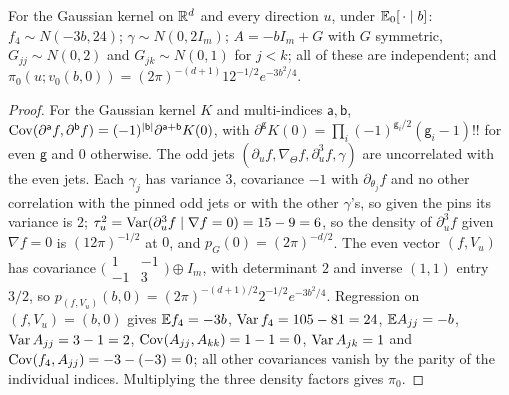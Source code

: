 \begin{lemma}\label{lem:cusp-gauss}
For the Gaussian kernel on $\mathbb R^d$ and every direction $u$, under $\mathbb E_0[\,\cdot\mid b]$: $f_4\sim N(-3b,24)$; $\gamma\sim N(0,2I_m)$; $A=-bI_m+G$ with $G$ symmetric, $G_{jj}\sim N(0,2)$ and $G_{jk}\sim N(0,1)$ for $j<k$; all of these are independent; and $\pi_0(u;v_0(b,0))=(2\pi)^{-(d+1)}12^{-1/2}e^{-3b^2/4}$.
\end{lemma}

\begin{proof}
For the Gaussian kernel $K$ and multi-indices $\mathsf a,\mathsf b$, $\operatorname{Cov}(\partial^{\mathsf a}f,\partial^{\mathsf b}f)=(-1)^{|\mathsf b|}\partial^{\mathsf a+\mathsf b}K(0)$, with $\partial^{\mathsf g}K(0)=\prod_i(-1)^{\mathsf g_i/2}(\mathsf g_i-1)!!$ for even $\mathsf g$ and $0$ otherwise. The odd jets $(\partial_uf,\nabla_\Theta f,\partial_u^3f,\gamma)$ are uncorrelated with the even jets. Each $\gamma_j$ has variance $3$, covariance $-1$ with $\partial_{\theta_j}f$ and no other correlation with the pinned odd jets or with the other $\gamma$'s, so given the pins its variance is $2$; $\tau_u^2=\operatorname{Var}(\partial_u^3f\mid\nabla f=0)=15-9=6$, so the density of $\partial_u^3f$ given $\nabla f=0$ is $(12\pi)^{-1/2}$ at $0$, and $p_G(0)=(2\pi)^{-d/2}$. The even vector $(f,V_u)$ has covariance $\bigl(\begin{smallmatrix}1&-1\\-1&3\end{smallmatrix}\bigr)\oplus I_m$, with determinant $2$ and inverse $(1,1)$ entry $3/2$, so $p_{(f,V_u)}(b,0)=(2\pi)^{-(d+1)/2}2^{-1/2}e^{-3b^2/4}$. Regression on $(f,V_u)=(b,0)$ gives $\mathbb E f_4=-3b$, $\operatorname{Var} f_4=105-81=24$, $\mathbb E A_{jj}=-b$, $\operatorname{Var} A_{jj}=3-1=2$, $\operatorname{Cov}(A_{jj},A_{kk})=1-1=0$, $\operatorname{Var} A_{jk}=1$ and $\operatorname{Cov}(f_4,A_{jj})=-3-(-3)=0$; all other covariances vanish by the parity of the individual indices. Multiplying the three density factors gives $\pi_0$.
\end{proof}

